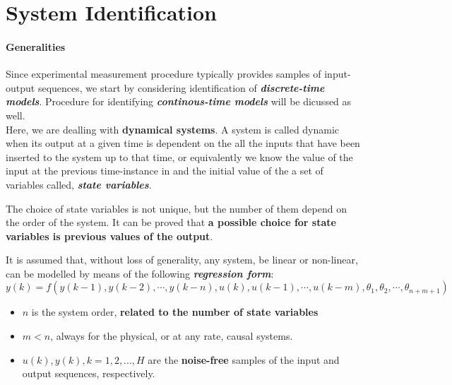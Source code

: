\chapter{System Identification}    %
\subsubsection{Generalities}


Since experimental measurement procedure typically provides samples of input-output sequences, we start by considering identification of \textbf{\textit{discrete-time models}}. Procedure for identifying \textit{\textbf{continous-time models}} will be dicussed as well.\\
Here, we are dealling with \textbf{dynamical systems}. A system is called dynamic when its output at a given time is dependent on the all the inputs that have been inserted to the system up to that time, or equivalently we know the value of the input at the previous time-instance in and the initial value of the a set of variables called, \textbf{\textit{state variables}}.

The choice of state variables is not unique, but the number of them depend on the order of the system. It can be proved that \textbf{a possible choice for state variables is previous values of the output}.

It is assumed that, without loss of generality, any system, be linear or non-linear, can be modelled by means of the following \textit{\textbf{regression form}}:\\
\begin{equation}
y(k) = f(y(k-1), y(k-2), \cdots, y(k-n), u(k), u(k-1), \cdots, u(k-m), \theta_1, \theta_2, \cdots, \theta_{n+m+1})
\end{equation}
\begin{itemize}
\item \(n\) is the system order, \textbf{related to the number of state variables}
\item \(m < n\), always for the physical, or at any rate, causal systems.
\item \(u(k), y(k), k = 1, 2, ..., H\) are the \textbf{noise-free} samples of the input and output sequences, respectively.\\
\end{itemize}

